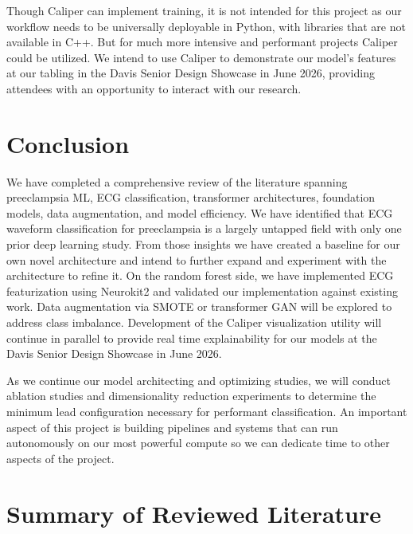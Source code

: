 \documentclass[sigconf,nonacm]{acmart}
\begin{document}
Though Caliper can implement training, it is not intended for this project as our workflow needs to be universally deployable in Python, with libraries that are not available in C++. But for much more intensive and performant projects Caliper could be utilized. We intend to use Caliper to demonstrate our model's features at our tabling in the Davis Senior Design Showcase in June 2026, providing attendees with an opportunity to interact with our research.

\section{Conclusion}
We have completed a comprehensive review of the literature spanning preeclampsia ML, ECG classification, transformer architectures, foundation models, data augmentation, and model efficiency. We have identified that ECG waveform classification for preeclampsia is a largely untapped field with only one prior deep learning study. From those insights we have created a baseline for our own novel architecture and intend to further expand and experiment with the architecture to refine it. On the random forest side, we have implemented ECG featurization using Neurokit2 and validated our implementation against existing work. Data augmentation via SMOTE or transformer GAN will be explored to address class imbalance. Development of the Caliper visualization utility will continue in parallel to provide real time explainability for our models at the Davis Senior Design Showcase in June 2026.

As we continue our model architecting and optimizing studies, we will conduct ablation studies and dimensionality reduction experiments to determine the minimum lead configuration necessary for performant classification. An important aspect of this project is building pipelines and systems that can run autonomously on our most powerful compute so we can dedicate time to other aspects of the project.



\appendix
\clearpage
\onecolumn
\section{Summary of Reviewed Literature}
\label{appendix:literature}
\end{document}

